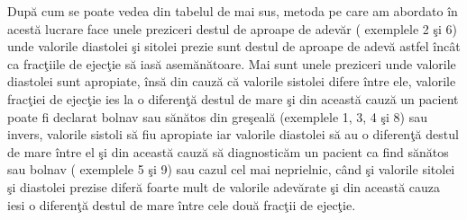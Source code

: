 Dup\u{a} cum se poate vedea din tabelul de mai sus, metoda pe care am abordato \^{i}n acest\u{a} lucrare face unele preziceri destul de aproape de adev\u{a}r ( exemplele 2 \c{s}i 6) unde valorile diastolei \c{s}i sitolei prezie sunt destul de aproape de adev\u{a} astfel \^{i}nc\^{a}t ca frac\c{t}iile de ejec\c{t}ie s\u{a} ias\u{a} asem\u{a}n\u{a}toare. Mai sunt unele preziceri unde valorile diastolei sunt apropiate, \^{i}ns\u{a} din cauz\u{a} c\u{a} valorile sistolei difere \^{i}ntre ele, valorile frac\c{t}iei de ejec\c{t}ie ies la o diferen\c{t}\u{a} destul de mare \c{s}i din aceast\u{a} cauz\u{a} un pacient poate fi declarat bolnav sau s\u{a}n\u{a}tos din gre\c{s}eal\u{a} (exemplele 1, 3, 4 \c{s}i 8) sau invers, valorile sistoli s\u{a} fiu apropiate iar valorile diastolei s\u{a} au o diferen\c{t}\u{a} destul de mare \^{i}ntre el \c{s}i din aceast\u{a} cauz\u{a} s\u{a} diagnostic\u{a}m un pacient ca find s\u{a}n\u{a}tos sau bolnav ( exemplele 5 \c{s}i 9) sau cazul cel mai neprielnic, c\^{a}nd \c{s}i valorile sitolei \c{s}i diastolei prezise difer\u{a} foarte mult de valorile adev\u{a}rate \c{s}i din aceast\u{a} cauza iesi o diferen\c{t}\u{a} destul de mare \^{i}ntre cele dou\u{a} frac\c{t}ii de ejec\c{t}ie.